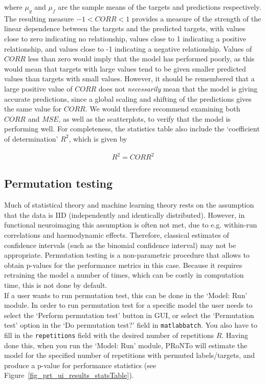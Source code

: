 where $\mu_y$ and $\mu_f$ are the sample means of the targets and predictions respectively. The resulting measure $-1<CORR<1$ provides a measure of the strength of the linear dependence between the targets and the predicted targets, with values close to zero indicating no relationship, values close to 1 indicating a positive relationship, and values close to -1 indicating a negative relationship. Values of $CORR$ less than zero would imply that the model has performed poorly, as this would mean that targets with large values tend to be given smaller predicted values than targets with small values. However, it should be remembered that a large positive value of $CORR$ does not \emph{necessarily} mean that the model is giving accurate predictions, since 
a global scaling and shifting of the predictions gives the same value for $CORR$. We would therefore recommend examining both $CORR$ and $MSE$, as well as the scatterplots, to verify that the model is performing well.  For completeness, the statistics table also include the `coefficient of determination' $R^2$, which is given by

\begin{equation}
\begin{aligned}
R^2=CORR^2
\end{aligned}
\end{equation}


\subsection{Permutation testing}
\label{ssec:perm_test}

Much of statistical theory and machine learning theory rests on the assumption that the data is IID (independently and identically distributed). However, in functional neuroimaging this assumption is often not met, due to e.g. within-run correlations and haemodynamic effects. Therefore, classical estimates of confidence intervals (such as the binomial confidence interval) may not be appropriate. Permutation testing is a non-parametric procedure that allows to obtain p-values for the performance metrics in this case. Because it requires retraining the model a number of times,  which can be costly in computation time, this is not done by default.
\\

If a user wants to run permutation test, this can be done in the `Model: Run' module. In order to run permutation test for a specific model the user needs to select the `Perform permutation test' button in GUI, or select the `Permutation test' option in the `Do permutation test?' field in {\tt matlabbatch}. You also have to fill in the {\tt repetitions} field with the desired number of repetitions $R$. Having done this, when you run the `Model: Run' module, PRoNTo will estimate the model for the specified number of repetitions with permuted labels/targets, and produce a  p-value for performance statistics (see Figure~\ref{fig_prt_ui_results_statsTable}).
\\

